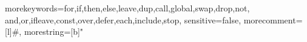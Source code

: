 \documentclass{article}
\begin{document}
{morekeywords={for,if,then,else,leave,dup,call,global,swap,drop,not,
and,or,ifleave,const,over,defer,each,include,stop},
sensitive=false,
morecomment=[l]{\#},
morestring=[b]"
}


\end{document}
